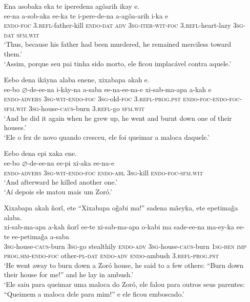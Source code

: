 \documentclass[output=paper,
modfonts,nonflat
]{langsci/langscibook}
\begin{document}
\ea Ena asobaka eka te iperedena agõarih ikay e.\\[.3em]
\gll ee-na a-sob-aka ee-ka te i-pere-de-na a-agõa-arih{\footnotemark} i-ka e\\
\textsc{endo-foc} \textsc{3.refl}-father-kill \textsc{endo-dat} \textsc{adv} \textsc{3sg-iter-wit-foc} \textsc{3.refl}-heart-lazy \textsc{3sg-dat} \textsc{sfm.wit}\\
\glt ‘Thus, because his father had been murdered, he remained merciless toward them.’\\
\glt ‘Assim, porque seu pai tinha sido morto, ele ficou implacável contra aquele.’\\
\z 

\ea Eebo dena ikãyna alaba enene, xixabapa akah e.\\[.3em]
\gll ee-bo \(\varnothing\)-de-ee-na i-kãy-na a-saba ee-na-ee-na-e xi-sab-ma-apa a-kah e\\
\textsc{endo-advers} \textsc{3sg-wit-endo-foc} \textsc{3sg}-old-\textsc{foc} \textsc{3.refl-prog.pst} \textsc{endo-foc-endo-foc-sfm.wit} \textsc{3sg}-house-\textsc{caus}-burn \textsc{3.refl}-go \textsc{sfm.wit}\\
\glt ‘And he did it again when he grew up, he went and burnt down one of their houses.’\\
\glt ‘Ele o fez de novo quando cresceu, ele foi queimar a maloca daquele.’\\
\z

 
\ea Eebo dena epi xaka ene.\\[.3em]
\gll ee-bo \(\varnothing\)-de-ee-na ee-pi xi-aka ee-na-e\\
\textsc{endo-advers} \textsc{3sg-wit-endo-foc} \textsc{endo-abl} \textsc{3sg}-kill \textsc{endo-foc-sfm.wit}\\
\glt ‘And afterward he killed another one.’\\
\glt ‘Aí depois ele matou mais um Zoró.’\\
\z

  
\ea Xixabapa akah ñorĩ, ete “Xixabapa o\~{g}abi ma!” sadena mãeyka, ete epetima\~{g}a alaba.\\[.3em]
\gll xi-sab-ma-apa a-kah ñorĩ ee-te xi-sab-ma-apa o-kabi ma sade-ee-na ma-ey-ka ee-te ee-petima\~{g}a a-saba\\
\textsc{3sg}-house-\textsc{caus}-burn \textsc{3sg}-go stealthily \textsc{endo-adv} \textsc{3sg}-house-\textsc{caus}-burn \textsc{1sg-ben} \textsc{imp} \textsc{prog.sim-endo-foc} other-\textsc{pl-dat} \textsc{endo-adv} \textsc{endo}-ambush \textsc{3.refl-prog.pst}\\
\glt ‘He went away to burn down a Zoró house, he said to a few others: “Burn down their house for me!” and he lay in ambush.’\\
\glt ‘Ele saiu para queimar uma maloca do Zoró, ele falou para outros seus parentes: “Queimem a maloca dele para mim!”  e ele ficou emboscado.’\\
\z
\end{document}
